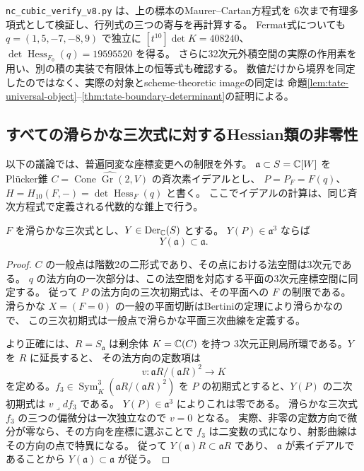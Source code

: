 \begin{remark}[計算証明書の範囲]
\texttt{nc\_cubic\_verify\_v8.py} は、上の標本のMaurer--Cartan方程式を
6次まで有理多項式として検証し、行列式の三つの寄与を再計算する。
Fermat式についても $q=(1,5,-7,-8,9)$ で独立に
$[t^{10}]\det K=408240$、$\det\operatorname{Hess}_{F_0}(q)=19595520$ を得る。
さらに32次元外積空間の実際の作用素を用い、別の積の実装で有限体上の恒等式も確認する。
数値だけから境界を同定したのではなく、実際の対象とscheme-theoretic imageの同定は
命題\ref{lem:tate-universal-object}--\ref{thm:tate-boundary-determinant}の証明による。
\end{remark}

\subsection{すべての滑らかな三次式に対するHessian類の非零性}
\label{subsec:all-smooth-hessian}

以下の議論では、普遍同変な座標変更への制限を外す。
$\mathfrak a\subset S=\mathbb C[W]$ をPl\"ucker錐
$C=\widehat{\operatorname{Cone}\operatorname{Gr}(2,V)}$ の斉次素イデアルとし、
$P=P_F=F(q)$、$H=H_{10}(F,-)=\det\operatorname{Hess}_F(q)$ と書く。
ここでイデアルの計算は、同じ斉次方程式で定義される代数的な錐上で行う。

\begin{lemma}[三次の位数を保つベクトル場の接性]
\label{lem:cubic-order-forces-tangency}
$F$ を滑らかな三次式とし、$Y\in\operatorname{Der}_{\mathbb C}(S)$ とする。
$Y(P)\in\mathfrak a^3$ ならば
\[
 Y(\mathfrak a)\subset\mathfrak a.
\]
\end{lemma}
\begin{proof}
$C$ の一般点は階数2の二形式であり、その点における法空間は3次元である。
$q$ の法方向の一次部分は、この法空間を対応する平面の3次元座標空間に同定する。
従って $P$ の法方向の三次初期式は、その平面への $F$ の制限である。
滑らかな $X=(F=0)$ の一般の平面切断はBertiniの定理により滑らかなので、
この三次初期式は一般点で滑らかな平面三次曲線を定義する。

より正確には、$R=S_{\mathfrak a}$ は剰余体 $K=\mathbb C(C)$ を持つ
3次元正則局所環である。$Y$ を $R$ に延長すると、
その法方向の定数項は
\[
 v\colon\mathfrak aR/(\mathfrak aR)^2\longrightarrow K
\]
を定める。$f_3\in\operatorname{Sym}^3_K(\mathfrak aR/(\mathfrak aR)^2)$
を $P$ の初期式とすると、$Y(P)$ の二次初期式は $v\lrcorner df_3$ である。
$Y(P)\in\mathfrak a^3$ によりこれは零である。
滑らかな三次式 $f_3$ の三つの偏微分は一次独立なので $v=0$ となる。
実際、非零の定数方向で微分が零なら、その方向を座標に選ぶことで
$f_3$ は二変数の式になり、射影曲線はその方向の点で特異になる。
従って $Y(\mathfrak a)R\subset\mathfrak aR$ であり、
$\mathfrak a$ が素イデアルであることから $Y(\mathfrak a)\subset\mathfrak a$ が従う。
\end{proof}

